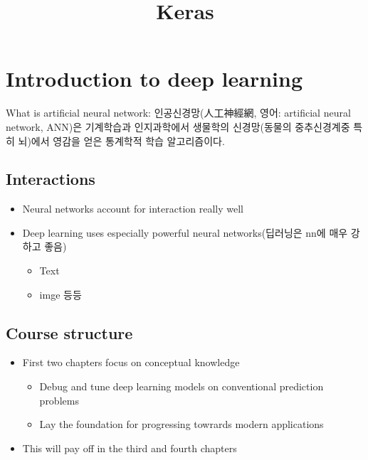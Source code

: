 \documentclass[11pt]{article}
\title{Keras}
\providecommand{\tightlist}{%
      \setlength{\itemsep}{0pt}\setlength{\parskip}{0pt}}
\begin{document}
    
    
    \maketitle
    
    

    
    \section{Introduction to deep
learning}\label{introduction-to-deep-learning}

    What is artificial neural network: 인공신경망(人工神經網, 영어:
artificial neural network, ANN)은 기계학습과 인지과학에서 생물학의
신경망(동물의 중추신경계중 특히 뇌)에서 영감을 얻은 통계학적 학습
알고리즘이다.

    \subsection{Interactions}\label{interactions}

\begin{itemize}
\tightlist
\item
  Neural networks account for interaction really well
\item
  Deep learning uses especially powerful neural networks(딥러닝은 nn에
  매우 강하고 좋음)

  \begin{itemize}
  \tightlist
  \item
    Text
  \item
    imge 등등
  \end{itemize}
\end{itemize}

    \subsection{Course structure}\label{course-structure}

\begin{itemize}
\tightlist
\item
  First two chapters focus on conceptual knowledge

  \begin{itemize}
  \tightlist
  \item
    Debug and tune deep learning models on conventional prediction
    problems
  \item
    Lay the foundation for progressing towrards modern applications
  \end{itemize}
\item
  This will pay off in the third and fourth chapters
\end{itemize}
\end{document}
